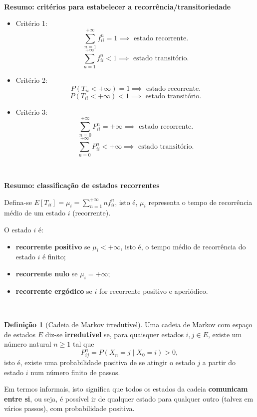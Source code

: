 \documentclass[
  11pt,
  a4paper,
]{book}
\theoremstyle{definition}
\newtheorem{definition}{Definição}[chapter]
\theoremstyle{definition}
\theoremstyle{definition}
\theoremstyle{definition}
\theoremstyle{remark}
\begin{document}
\(\,\)

\textbf{Resumo: critérios para estabelecer a recorrência/transitoriedade}

\begin{itemize}
\item
  Critério 1:
  \[\sum\limits_{n=1}^{+\infty}f_{ii}^n=1 \implies \text{ estado recorrente}.\]
  \[\sum\limits_{n=1}^{+\infty}f_{ii}^n<1 \implies \text{ estado transitório}.\]
\item
  Critério 2:
  \[P(T_{ii}<+\infty)=1 \implies \text{ estado recorrente}.\]
  \[P(T_{ii}<+\infty)<1\implies \text{ estado transitório}.\]
\item
  Critério 3:
  \[\sum\limits_{n=0}^{+\infty}P_{ii}^n=+\infty \implies \text{ estado recorrente}.\]
  \[\sum\limits_{n=0}^{+\infty}P_{ii}^n<+\infty \implies \text{ estado transitório}.\]
\end{itemize}

\(\,\)

\textbf{Resumo: classificação de estados recorrentes}

Defina-se \(E[T_{ii}]=\mu_i=\sum\limits_{n=1}^{+\infty}nf_{ii}^n\), isto é, \(\mu_i\) representa o tempo de recorrência médio de um estado \(i\) (recorrente).

O estado \(i\) é:

\begin{itemize}
\item
  \textbf{recorrente positivo} se \(\mu_i<+\infty\), isto é, o tempo médio de recorrência do estado \(i\) é finito;
\item
  \textbf{recorrente nulo} se \(\mu_i=+\infty\);
\item
  \textbf{recorrente ergódico} se \(i\) for recorrente positivo e aperiódico.
\end{itemize}

\(\,\)

\begin{definition}[Cadeia de Markov irredutível]
Uma cadeia de Markov com espaço de estados \(E\) diz-se \textbf{irredutível} se, para quaisquer estados \(i, j \in E\), existe um número natural \(n \geq 1\) tal que
\[
P_{ij}^n = P(X_n = j \mid X_0 = i) > 0,
\]
isto é, existe uma probabilidade positiva de se atingir o estado \(j\) a partir do estado \(i\) num número finito de passos.

Em termos informais, isto significa que todos os estados da cadeia \textbf{comunicam entre si}, ou seja, é possível ir de qualquer estado para qualquer outro (talvez em vários passos), com probabilidade positiva.
\end{definition}
\end{document}
